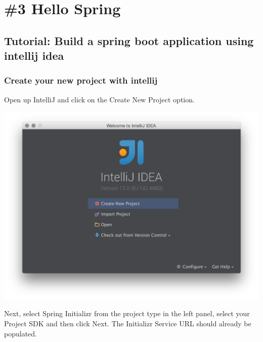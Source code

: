 \hypertarget{hello-spring}{%
\section{\#3 Hello Spring}\label{hello-spring}}

\hypertarget{tutorial-build-a-spring-boot-application-using-intellij-idea}{%
\subsection{Tutorial: Build a spring boot application using intellij
idea}\label{tutorial-build-a-spring-boot-application-using-intellij-idea}}

\hypertarget{create-your-new-project-with-intellij}{%
\subsubsection{Create your new project with
intellij}\label{create-your-new-project-with-intellij}}

Open up IntelliJ and click on the Create New Project option.

\includegraphics{rsc/1.png}

Next, select Spring Initializr from the project type in the left panel,
select your Project SDK and then click Next. The Initializr Service URL
should already be populated.

